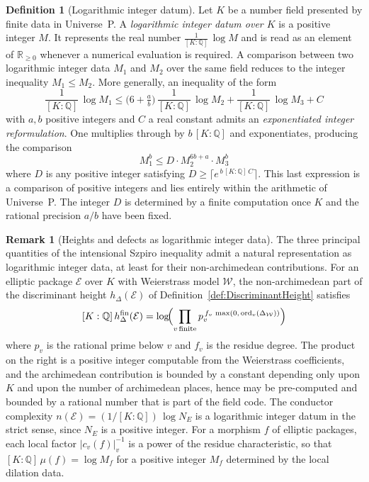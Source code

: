 \documentclass[10pt, reqno]{amsart}
\theoremstyle{plain}
\theoremstyle{definition}
\newtheorem{definition}[theorem]{Definition}
\newtheorem{remark}[theorem]{Remark}
\theoremstyle{plain}
\newcommand{\Q}{\mathbb{Q}}
\newcommand{\R}{\mathbb{R}}
\begin{document}
\begin{definition}[Logarithmic integer datum]\label{def:LogIntDatum}
Let $K$ be a number field presented by finite data in Universe~P. A \emph{logarithmic integer datum over $K$} is a positive integer $M$. It represents the real number $\frac{1}{[K:\Q]}\,\log M$ and is read as an element of $\R_{\ge 0}$ whenever a numerical evaluation is required. A comparison between two logarithmic integer data $M_1$ and $M_2$ over the same field reduces to the integer inequality $M_1 \le M_2$. More generally, an inequality of the form
\[
  \frac{1}{[K:\Q]}\,\log M_1
  \le
  \bigl(6+\tfrac{a}{b}\bigr)\,\frac{1}{[K:\Q]}\,\log M_2
  +
  \frac{1}{[K:\Q]}\,\log M_3
  +
  C
\]
with $a,b$ positive integers and $C$ a real constant admits an \emph{exponentiated integer reformulation}. One multiplies through by $b\,[K:\Q]$ and exponentiates, producing the comparison
\[
  M_1^b \le D \cdot M_2^{6b+a} \cdot M_3^b
\]
where $D$ is any positive integer satisfying $D \ge \lceil e^{\,b\,[K:\Q]\,C} \rceil$. This last expression is a comparison of positive integers and lies entirely within the arithmetic of Universe~P. The integer $D$ is determined by a finite computation once $K$ and the rational precision $a/b$ have been fixed.
\end{definition}

\begin{remark}[Heights and defects as logarithmic integer data]\label{rem:HeightsAsLogIntData}
The three principal quantities of the intensional Szpiro inequality admit a natural representation as logarithmic integer data, at least for their non-archimedean contributions. For an elliptic package $\mathcal{E}$ over $K$ with Weierstrass model $\mathcal{W}$, the non-archimedean part of the discriminant height $h_\Delta(\mathcal{E})$ of Definition~\ref{def:DiscriminantHeight} satisfies
\[
  [K:\Q]\,h_\Delta^{\mathrm{fin}}(\mathcal{E})
  =
  \log\!\Bigl(\prod_{v\,\text{finite}} p_v^{\,f_v\,\max(0,\,\mathrm{ord}_v(\Delta_{\mathcal{W}}))}\Bigr)
\]
where $p_v$ is the rational prime below $v$ and $f_v$ is the residue degree. The product on the right is a positive integer computable from the Weierstrass coefficients, and the archimedean contribution is bounded by a constant depending only upon $K$ and upon the number of archimedean places, hence may be pre-computed and bounded by a rational number that is part of the field code. The conductor complexity $n(\mathcal{E}) = (1/[K:\Q])\,\log N_E$ is a logarithmic integer datum in the strict sense, since $N_E$ is a positive integer. For a morphism $f$ of elliptic packages, each local factor $|c_v(f)|_v^{-1}$ is a power of the residue characteristic, so that $[K:\Q]\,\mu(f) = \log M_f$ for a positive integer $M_f$ determined by the local dilation data.
\end{remark}
\end{document}
